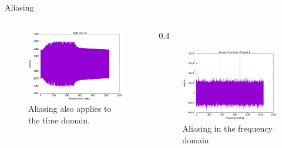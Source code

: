 \documentclass[10pt, aspectratio=168]{beamer}
\begin{document}
    \begin{frame}{Aliasing}
    \begin{columns}
    \begin{column}{0.4\textwidth}
    \begin{figure}[h]
    \centering
    \includegraphics[width=1\textwidth]{time-aliasing.png}
    \caption{Aliasing also applies to the time domain.}
    \label{fig:time-aliasing}
    \end{figure}
    \end{column}
    \begin{column} {0.4\textwidth}
    \begin{figure}[h]
    \centering 
    \includegraphics[width=1\textwidth]{fft_test_08.png}
    \caption{Aliasing in the frequency domain}
    \label{fig:fft-test-08}
    \end{figure}
    \end{column}
    \end{columns}
    \end{frame}
\end{document}
